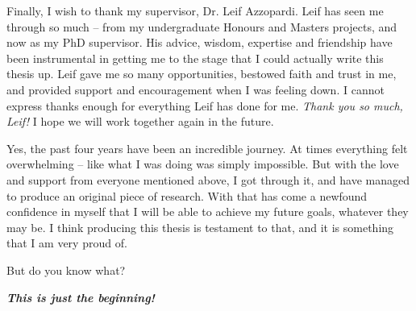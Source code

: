 \begin{preamble}
Finally, I wish to thank my supervisor, Dr. Leif Azzopardi. Leif has seen me through so much -- from my undergraduate Honours and Masters projects, and now as my PhD supervisor. His advice, wisdom, expertise and friendship have been instrumental in getting me to the stage that I could actually write this thesis up. Leif gave me so many opportunities, bestowed faith and trust in me, and provided support and encouragement when I was feeling down. I cannot express thanks enough for everything Leif has done for me. \emph{Thank you so much, Leif!} I hope we will work together again in the future.

Yes, the past four years have been an incredible journey. At times everything felt overwhelming -- like what I was doing was simply impossible. But with the love and support from everyone mentioned above, I got through it, and have managed to produce an original piece of research. With that has come a newfound confidence in myself that I will be able to achieve my future goals, whatever they may be. I think producing this thesis is testament to that, and it is something that I am very proud of.

But do you know what?

\textbf{\emph{This is just the beginning!}}

\end{preamble}


